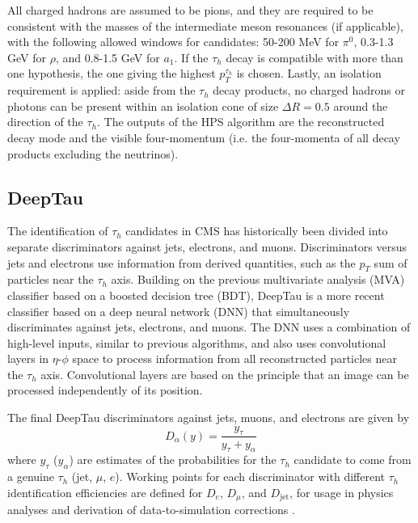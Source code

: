 All charged hadrons are assumed to be pions, and they are required to be consistent with the masses of the intermediate meson resonances (if applicable), with the following allowed windows for candidates: 50-200 MeV for $\pi^0$, 0.3-1.3 GeV for $\rho$, and 0.8-1.5 GeV for $a_1$. If the $\tau_{h}$ decay is compatible with more than one hypothesis, the one giving the highest $p_{T}^{\tau_{h}}$ is chosen. Lastly, an isolation requirement is applied: aside from the $\tau_{h}$ decay products, no charged hadrons or photons can be present within an isolation cone of size $\Delta R = 0.5$ around the direction of the $\tau_{h}$. The outputs of the HPS algorithm are the reconstructed decay mode and the visible four-momentum (i.e. the four-momenta of all decay products excluding the neutrinos).

\subsection{DeepTau}
The identification of $\tau_{h}$ candidates in CMS has historically been divided into separate discriminators against jets, electrons, and muons. Discriminators versus jets and electrons use information from derived quantities, such as the $p_{T}$ sum of particles near the $\tau_{h}$ axis. Building on the previous multivariate analysis (MVA) classifier \cite{2018-CMS-JRD-tauMVA} based on a boosted decision tree (BDT), DeepTau is a more recent classifier based on a deep neural network (DNN) that simultaneously discriminates against jets, electrons, and muons. The DNN uses a combination of high-level inputs, similar to previous algorithms, and also uses convolutional layers in $\eta$-$\phi$ space to process information from all reconstructed particles near the $\tau_{h}$ axis. Convolutional layers are based on the principle that an image can be processed independently of its position. 

The final DeepTau discriminators against jets, muons, and electrons are given by 
\begin{equation}
    D_\alpha(y) = \frac{y_{\tau}}{y_{\tau} + y_{\alpha}}
\end{equation}
where $y_\tau$ ($y_\alpha$) are estimates of the probabilities for the $\tau_{h}$ candidate to come from a genuine $\tau_{h}$ (jet, $\mu$, $e$). Working points for each discriminator with different $\tau_{h}$ identification efficiencies are defined for $D_{e}$, $D_{\mu}$, and $D_{\text{jet}}$, for usage in physics analyses and derivation of data-to-simulation corrections \cite{2022-PRD-DeepTau}. 

